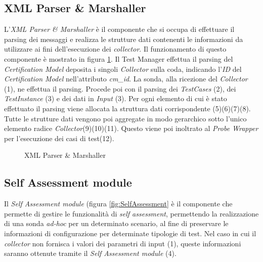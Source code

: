 \documentclass[../main.tex]{subfiles}
\begin{document}
\subsection {XML Parser \& Marshaller}
L'\textit{XML Parser \& Marshaller} è il componente che si occupa di effettuare il parsing dei messaggi e realizza le strutture dati contenenti le informazioni da utilizzare ai fini dell'esecuzione dei \textit{collector}.
Il funzionamento di questo componente è mostrato in figura \ref{fig:XMLParser}.
Il Test Manager effettua il parsing del \textit{Certification Model} deposita i singoli \textit{Collector} sulla coda, indicando l'\textit{ID} del \textit{Certification Model} nell'attributo \textit{cm\_id}. La sonda, alla ricezione del \textit{Collector} (1), ne effettua il parsing. Procede poi con il parsing dei \textit{TestCases} (2), dei \textit{TestInstance} (3) e dei dati in \textit{Input} (3).
Per ogni elemento di cui è stato effettuato il parsing viene allocata la struttura dati corrispondente (5)(6)(7)(8).
Tutte le strutture dati vengono poi aggregate in modo gerarchico sotto l'unico elemento radice \textit{Collector}(9)(10)(11).
Questo viene poi inoltrato al \textit{Probe Wrapper} per l'esecuzione dei casi di test(12).
\begin{figure}[H]
\centering
{}
\caption{XML Parser \& Marshaller}\label{fig:XMLParser}
\end{figure}

\newpage
\subsection {Self Assessment module}
Il \textit{Self Assessment module} (figura \ref{fig:SelfAssessment} è il componente che permette di gestire le funzionalità di \textit{self assessment}, permettendo la realizzazione di una sonda \textit{ad-hoc} per un determinato scenario, al fine di preservare le informazioni di configurazione per determinate tipologie di test.
Nel caso in cui il \textit{collector} non fornisca i valori dei parametri di input (1), queste informazioni saranno ottenute tramite il \textit{Self Assessment module} (4).
\end{document}
